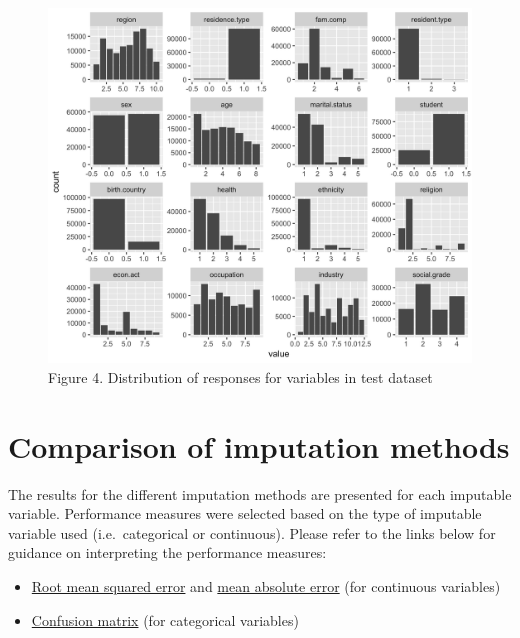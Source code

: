 \documentclass[]{book}
\providecommand{\tightlist}{%
  \setlength{\itemsep}{0pt}\setlength{\parskip}{0pt}}
\begin{document}
\begin{figure}
\centering
\includegraphics{images/dist_test.png}
\caption{Figure 4. Distribution of responses for variables in test
dataset}
\end{figure}

\section{Comparison of imputation
methods}\label{comparison-of-imputation-methods}

The results for the different imputation methods are presented for each
imputable variable. Performance measures were selected based on the type
of imputable variable used (i.e.~categorical or continuous). Please
refer to the links below for guidance on interpreting the performance
measures:

\begin{itemize}
\tightlist
\item
  \href{https://medium.com/human-in-a-machine-world/mae-and-rmse-which-metric-is-better-e60ac3bde13d}{Root
  mean squared error} and
  \href{https://medium.com/human-in-a-machine-world/mae-and-rmse-which-metric-is-better-e60ac3bde13d}{mean
  absolute error} (for continuous variables)\\
\item
  \href{https://www.dataschool.io/simple-guide-to-confusion-matrix-terminology/}{Confusion
  matrix} (for categorical variables)
\end{itemize}
\end{document}
